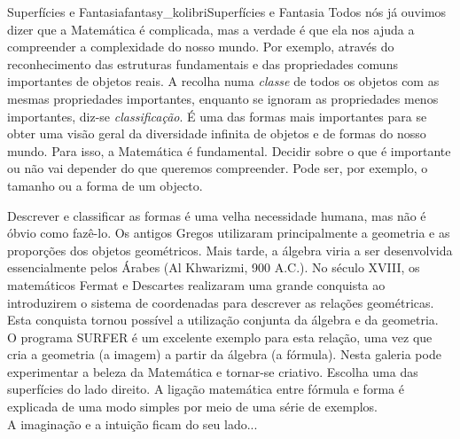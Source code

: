 \begin{surferIntroPage}{Superfícies e Fantasia}{fantasy_kolibri}{Superfícies e Fantasia}
Todos n\'os j\'a ouvimos dizer que a Matem\'atica \'e complicada, mas a verdade \'e que ela nos ajuda a compreender a complexidade do nosso mundo.  Por exemplo, atrav\'es do
reconhecimento das estruturas fundamentais e das propriedades comuns  importantes de
objetos reais. A recolha numa \textit{classe} de todos os objetos com as mesmas propriedades importantes,
enquanto se ignoram as propriedades menos importantes, diz-se {\it  classifica\c c\~ao}. \'E uma das formas mais importantes para se obter uma vis\~ao geral da diversidade infinita de
objetos e de formas do nosso mundo. Para isso, a Matem\'atica \'e fundamental. Decidir
sobre o que \'e importante ou n\~ao vai depender do que queremos compreender. 
Pode ser, por exemplo, o tamanho ou a forma de um objecto.
\\

\vspace{0.4cm}

Descrever e classificar as formas \'e uma velha necessidade humana,  mas n\~ao \'e \'obvio como faz\^e-lo. Os antigos Gregos utilizaram principalmente a geometria e as propor\c c\~oes dos objetos geom\'etricos. Mais tarde, a \'algebra viria a ser desenvolvida essencialmente pelos \'Arabes (Al Khwarizmi, 900
A.C.). No s\'eculo XVIII, os matem\'aticos
Fermat e Descartes realizaram uma grande conquista ao introduzirem o sistema de coordenadas para descrever as rela\c c\~oes geom\'etricas. Esta conquista tornou poss\'ivel a utiliza\c c\~ao conjunta da \'algebra e da geometria.
\\
\vspace{0.4cm}
O programa SURFER \'e um excelente exemplo para esta rela\c c\~ao, uma vez que cria
a geometria (a imagem) a partir  da \'algebra (a f\'ormula).
Nesta galeria pode
experimentar a beleza da Matem\'atica e tornar-se criativo. Escolha uma
das superf\'icies do lado direito. A liga\c c\~ao matem\'atica entre f\'ormula
e forma \'e explicada de uma modo simples por meio de uma s\'erie de exemplos.\\
A imagina\c c\~ao e a intui\c c\~ao ficam do seu lado...
\end{surferIntroPage}
